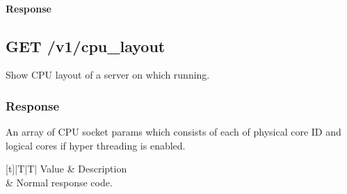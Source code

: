 \documentclass[a4paper,11pt,openany,oneside,english]{sphinxmanual}
\begin{document}
\paragraph{Response}
\label{\detokenize{api_ref/proc_independ:id1}}
\begin{sphinxVerbatim}[commandchars=\\\{\},formatcom=\footnotesize]
\PYG{p}{[}
     
     
     
     
     
\PYG{p}{]}
\end{sphinxVerbatim}


\subsection{GET /v1/cpu\_layout}
\label{\detokenize{api_ref/proc_independ:get-v1-cpu-layout}}
Show CPU layout of a server on which  running.


\subsubsection{Response}
\label{\detokenize{api_ref/proc_independ:id2}}
An array of CPU socket params which consists of each of physical core ID and
logical cores if hyper threading is enabled.


\begin{savenotes}\sphinxattablestart
\centering
{}
\sphinxthecaptionisattop
{}\label{\detokenize{api_ref/proc_independ:id12}}\label{\detokenize{api_ref/proc_independ:table-spp-ctl-cpu-layout-codes}}
\sphinxaftertopcaption
\begin{tabulary}{\linewidth}[t]{|T|T|}
\hline
\sphinxstyletheadfamily 
Value
&\sphinxstyletheadfamily 
Description
\\
&
Normal response code.
\\
\hline
\end{tabulary}
\par
\sphinxattableend\end{savenotes}
\end{document}
